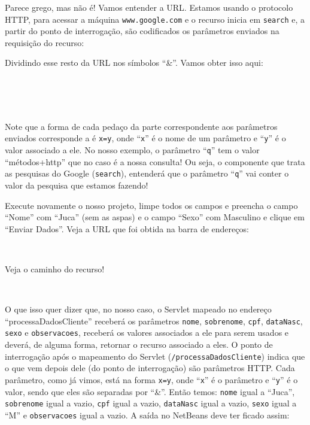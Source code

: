 
Parece grego, mas não é! Vamos entender a URL. Estamos usando o protocolo HTTP, para acessar a máquina \texttt{www.google.com} e o recurso inicia em \texttt{search} e, a partir do ponto de interrogação, são codificados os parâmetros enviados na requisição do recurso:


Dividindo esse resto da URL nos símbolos ``\&''. Vamos obter isso aqui:

\\
\\
\\

Note que a forma de cada pedaço da parte correspondente aos parâmetros enviados corresponde a é \texttt{x=y}, onde ``\texttt{x}'' é o nome de um parâmetro e ``\texttt{y}'' é o valor associado a ele. No nosso exemplo, o parâmetro ``\texttt{q}'' tem o valor ``métodos+http'' que no caso é a nossa consulta! Ou seja, o componente que trata as pesquisas do Google (\texttt{search}), entenderá que o parâmetro ``\texttt{q}'' vai conter o valor da pesquisa que estamos fazendo!

Execute novamente o nosso projeto, limpe todos os campos e preencha o campo ``Nome'' com ``Juca'' (sem as aspas) e o campo ``Sexo'' com Masculino e clique em ``Enviar Dados''. Veja a URL que foi obtida na barra de endereços:

\\

Veja o caminho do recurso!

\\

O que isso quer dizer que, no nosso caso, o Servlet mapeado no endereço ``processaDadosCliente'' receberá os parâmetros \texttt{nome}, \texttt{sobrenome}, \texttt{cpf}, \texttt{dataNasc}, \texttt{sexo} e \texttt{observacoes}, receberá os valores associados a ele para serem usados e deverá, de alguma forma, retornar o recurso associado a eles. O ponto de interrogação após o mapeamento do Servlet (\texttt{/processaDadosCliente}) indica que o que vem depois dele (do ponto de interrogação) são parâmetros HTTP. Cada parâmetro, como já vimos, está na forma \texttt{x=y}, onde ``\texttt{x}'' é o parâmetro e ``\texttt{y}'' é o valor, sendo que eles são separadas por ``\&''. Então temos: \texttt{nome} igual a ``Juca'', \texttt{sobrenome} igual a vazio, \texttt{cpf} igual a vazio, \texttt{dataNasc} igual a vazio, \texttt{sexo} igual a ``M'' e \texttt{observacoes} igual a vazio. A saída no NetBeans deve ter ficado assim:

